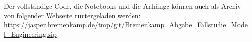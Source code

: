 \documentclass[%
pdftex,
oneside,			%
11pt,				%
parskip=half,		%
headheight = 12pt,	%
headsepline,		%
footsepline,		%
footheight = 16pt,	%
abstracton,		%
DIV=calc,		%
BCOR=8mm,		%
headinclude=false,	%
footinclude=false,	%
listof=totoc,		%
toc=bibliography,	%
]{scrreprt}	%
\begin{document}


\cleardoublepage

\appendix

\label{sec:appendix}

Der vollständige Code, die Notebooks und die Anhänge können auch als Archiv von folgender Webseite runtergeladen werden: \\
\url{https://jasper.bremenkamp.de/tmp/git/Bremenkamp_Abgabe_Fallstudie_Model_Engineering.zip}
\end{document}
